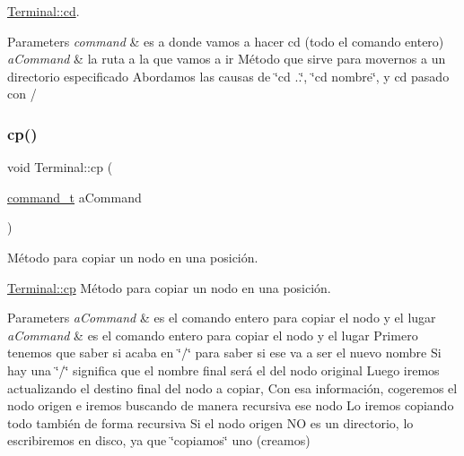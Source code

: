\hyperlink{classTerminal_af0648dba26e96c50ac5ea311cda505bc}{Terminal\+::cd}.


\begin{DoxyParams}{Parameters}
{\em command} & es a donde vamos a hacer cd (todo el comando entero)\\
\hline
{\em a\+Command} & la ruta a la que vamos a ir Método que sirve para movernos a un directorio especificado Abordamos las causas de \char`\"{}cd ..\char`\"{}, \char`\"{}cd nombre\char`\"{}, y cd pasado con / \\
\hline
\end{DoxyParams}
\mbox{\label{classTerminal_afff07151e9fdceeccb3772b3eff66fd1}} 
\subsubsection{\texorpdfstring{cp()}{cp()}}
{\footnotesize\ttfamily void Terminal\+::cp (\begin{DoxyParamCaption}\item[{\hyperlink{structcommand__t}{command\+\_\+t}}]{a\+Command }\end{DoxyParamCaption})}



Método para copiar un nodo en una posición. 

\hyperlink{classTerminal_afff07151e9fdceeccb3772b3eff66fd1}{Terminal\+::cp} Método para copiar un nodo en una posición.


\begin{DoxyParams}{Parameters}
{\em a\+Command} & es el comando entero para copiar el nodo y el lugar\\
\hline
{\em a\+Command} & es el comando entero para copiar el nodo y el lugar Primero tenemos que saber si acaba en \char`\"{}/\char`\"{} para saber si ese va a ser el nuevo nombre Si hay una \char`\"{}/\char`\"{} significa que el nombre final será el del nodo original Luego iremos actualizando el destino final del nodo a copiar, Con esa información, cogeremos el nodo origen e iremos buscando de manera recursiva ese nodo Lo iremos copiando todo también de forma recursiva Si el nodo origen NO es un directorio, lo escribiremos en disco, ya que \char`\"{}copiamos\char`\"{} uno (creamos) \\
\hline
\end{DoxyParams}
\mbox{\label{classTerminal_ae65a3c6d061449b0607e3caa1691b3c7}} 
